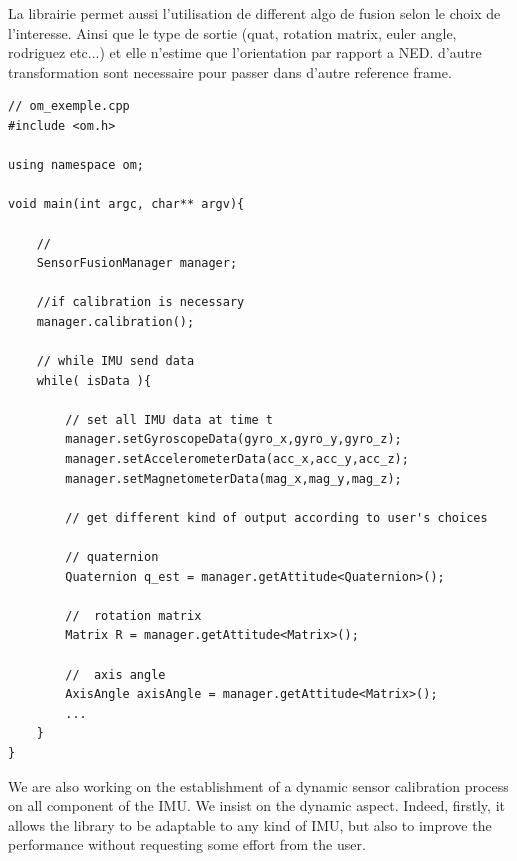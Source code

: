 La librairie permet aussi l'utilisation de different algo de fusion selon le choix de l'interesse. 
Ainsi que le type de sortie (quat, rotation matrix, euler angle, rodriguez etc...)
et elle n'estime que l'orientation par rapport a NED. d'autre transformation sont necessaire pour passer dans d'autre reference frame.




\begin{lstlisting}
// om_exemple.cpp
#include <om.h>

using namespace om;

void main(int argc, char** argv){

	// 
	SensorFusionManager manager;

	//if calibration is necessary
	manager.calibration();
	
	// while IMU send data
	while( isData ){

		// set all IMU data at time t
		manager.setGyroscopeData(gyro_x,gyro_y,gyro_z);	
		manager.setAccelerometerData(acc_x,acc_y,acc_z);
		manager.setMagnetometerData(mag_x,mag_y,mag_z);
		
		// get different kind of output according to user's choices
		
		// quaternion
		Quaternion q_est = manager.getAttitude<Quaternion>(); 
		
		//  rotation matrix
		Matrix R = manager.getAttitude<Matrix>(); 
		
		//  axis angle
		AxisAngle axisAngle = manager.getAttitude<Matrix>(); 
		...
	}
}
\end{lstlisting}

We are also working on the establishment of a dynamic sensor calibration process on all component of the IMU. We insist on the dynamic aspect. Indeed, firstly, it allows  the library to be adaptable to any kind of IMU, but also to improve the performance without requesting some effort from the user.
